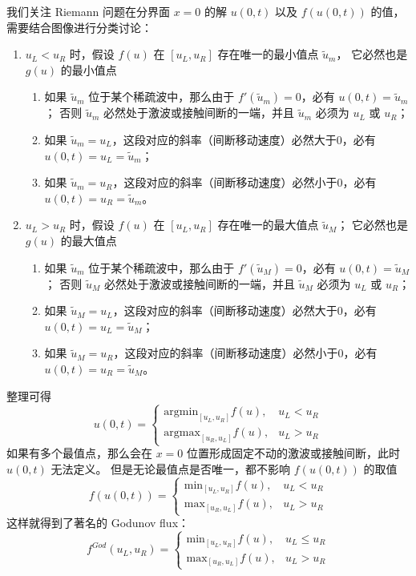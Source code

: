 我们关注 Riemann 问题在分界面 $x=0$ 的解 $u(0,t)$ 以及 $f(u(0,t))$ 的值，需要结合图像进行分类讨论：
\begin{enumerate}
    \item $u_L < u_R$ 时，假设 $f(u)$ 在 $[u_L,u_R]$ 存在唯一的最小值点 $\widetilde{u}_m$，
          它必然也是 $g(u)$ 的最小值点
          \begin{enumerate}
              \item 如果 $\widetilde{u}_m$ 位于某个稀疏波中，那么由于 $f'(\widetilde{u}_m) = 0$，必有 $u(0,t) = \widetilde{u}_m$；
                    否则 $\widetilde{u}_m$ 必然处于激波或接触间断的一端，并且 $\widetilde{u}_m$ 必须为 $u_L$ 或 $u_R$；
              \item 如果 $\widetilde{u}_m = u_L$，这段对应的斜率（间断移动速度）必然大于0，必有 $u(0,t) = u_L = \widetilde{u}_m$；
              \item 如果 $\widetilde{u}_m = u_R$，这段对应的斜率（间断移动速度）必然小于0，必有 $u(0,t) = u_R = \widetilde{u}_m$。
          \end{enumerate}
    \item $u_L > u_R$ 时，假设 $f(u)$ 在 $[u_L,u_R]$ 存在唯一的最大值点 $\widetilde{u}_M$；
          它必然也是 $g(u)$ 的最大值点
          \begin{enumerate}
              \item 如果 $\widetilde{u}_m$ 位于某个稀疏波中，那么由于 $f'(\widetilde{u}_M) = 0$，必有 $u(0,t) = \widetilde{u}_M$；
                    否则 $\widetilde{u}_M$ 必然处于激波或接触间断的一端，并且 $\widetilde{u}_M$ 必须为 $u_L$ 或 $u_R$；
              \item 如果 $\widetilde{u}_M = u_L$，这段对应的斜率（间断移动速度）必然大于0，必有 $u(0,t) = u_L = \widetilde{u}_M$；
              \item 如果 $\widetilde{u}_M = u_R$，这段对应的斜率（间断移动速度）必然小于0，必有 $u(0,t) = u_R = \widetilde{u}_M$。
          \end{enumerate}
\end{enumerate}
整理可得
\[
    u(0,t) =
    \begin{cases}
        \text{argmin}_{[u_L,u_R]} f(u), & u_L < u_R \\
        \text{argmax}_{[u_R,u_L]} f(u), & u_L > u_R
    \end{cases}
\]
如果有多个最值点，那么会在 $x=0$ 位置形成固定不动的激波或接触间断，此时 $u(0,t)$ 无法定义。
但是无论最值点是否唯一，都不影响 $f(u(0,t))$ 的取值
\[
    f(u(0,t)) =
    \begin{cases}
        \text{min}_{[u_L,u_R]} f(u), & u_L < u_R \\
        \text{max}_{[u_R,u_L]} f(u), & u_L > u_R
    \end{cases}
\]
这样就得到了著名的 Godunov flux：
\[
    f^{God}(u_L,u_R) =
    \begin{cases}
        \text{min}_{[u_L,u_R]} f(u), & u_L \le u_R \\
        \text{max}_{[u_R,u_L]} f(u), & u_L > u_R
    \end{cases}
\]

